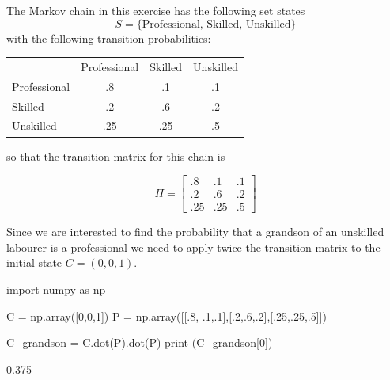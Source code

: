 \cprotEnv\begin{solution}
The Markov chain in this exercise has the following set states
\begin{equation*}
S = \{\textrm{Professional, Skilled, Unskilled}\}
\end{equation*}
with the following transition probabilities:

\begin{table}[htbp]
\centering
\begin{tabular}{l c c c}
&Professional& Skilled &Unskilled \\
Professional & .8 & .1 & .1 \\
Skilled & .2 & .6 & .2 \\
Unskilled & .25 & .25 & .5 \\
\end{tabular}
\end{table}
\noindent
so that the transition matrix for this chain is

\begin{equation*}
\Pi =
\begin{bmatrix}
.8 &.1 &.1\\
.2 &.6 &.2\\
.25 &.25 &.5
\end{bmatrix}
\end{equation*}

Since we are interested to find the probability that a grandson of an unskilled labourer is a professional we need to apply twice the transition matrix to the initial state $C=(0, 0, 1)$.
\begin{ipython}
import numpy as np

C = np.array([0,0,1])
P = np.array([[.8, .1,.1],[.2,.6,.2],[.25,.25,.5]])

C_grandson = C.dot(P).dot(P)
print (C_grandson[0])
\end{ipython}
\begin{ioutput}
0.375
\end{ioutput}
\end{solution}


